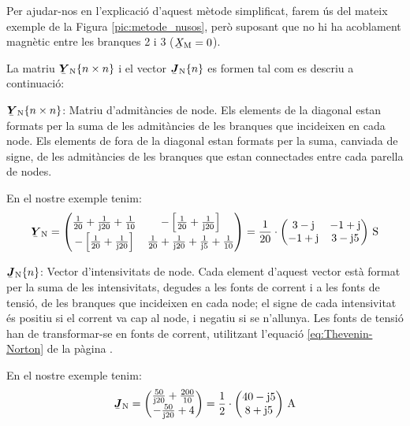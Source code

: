 Per ajudar-nos en l'explicaci\'{o} d'aquest m\`{e}tode simplificat, farem \'{u}s
del mateix exemple de la Figura \vref{pic:metode_nusos}, per\`{o}
suposant que no hi ha acoblament magn\`{e}tic entre les branques 2 i 3
($\cmplx{X}\ped{M}=0$).

La matriu $\mcmplx{Y}\ped{N}\{n \times n\}$ i el vector $\mcmplx{J}\ped{N}\{n\}$ es formen tal com es descriu a continuaci\'{o}:

\begin{list}{}
   {\setlength{\labelwidth}{20mm} \setlength{\leftmargin}{22mm} \setlength{\labelsep}{2mm}}

   \item[$\mcmplx{Y}\ped{N}\{n \times n\}$:] Matriu d'admit\`{a}ncies de node. Els elements de la diagonal estan formats per la suma de les admit\`{a}ncies de les branques que incideixen en cada node.
   Els elements de fora de la diagonal estan formats per la suma, canviada de signe, de les admit\`{a}ncies de les branques que estan connectades entre cada parella de nodes.

   En el nostre exemple tenim:
   \[
      \mcmplx{Y}\ped{N} =
      \begin{pmatrix}
            \frac{1}{20} + \frac{1}{\ju 20} +  \frac{1}{10} &
            -\left[\frac{1}{20} + \frac{1}{\ju 20}\right] \\
            -\left[\frac{1}{20} + \frac{1}{\ju 20}\right]  &
            \frac{1}{20} + \frac{1}{\ju 20} +  \frac{1}{\ju 5} + \frac{1}{10}
      \end{pmatrix} =
      \frac{1}{20} \cdot \begin{pmatrix}
            3 - \ju  & -1 + \ju \\ -1 + \ju & 3 - \ju 5
      \end{pmatrix}\unit{S}
   \]

   \item[$\mcmplx{J}\ped{N}\{n\}$:] Vector d'intensivitats de node. Cada element d'aquest vector est\`{a} format per la suma de les intensivitats, degudes a les fonts de corrent i a les fonts de tensi\'{o}, de les branques que incideixen en cada node; el signe de cada intensivitat \'{e}s positiu si el corrent va cap al node, i negatiu si se n'allunya. Les fonts de tensi\'{o} han de transformar-se en fonts de corrent, utilitzant l'equaci\'{o} \eqref{eq:Thevenin-Norton} de la p\`{a}gina \pageref{eq:Thevenin-Norton}.

   En el nostre exemple tenim:
   \[
      \mcmplx{J}\ped{N} =
      \begin{pmatrix}
            \frac{50}{\ju 20} +  \frac{200}{10} \\
            - \frac{50}{\ju 20} + 4
      \end{pmatrix} =
      \frac{1}{2} \cdot \begin{pmatrix}
            40 - \ju 5 \\
            8 + \ju 5
      \end{pmatrix}\unit{A}
   \]

\end{list}

